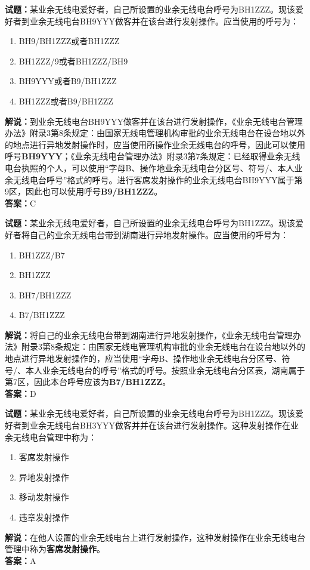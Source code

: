 \documentclass{ctexbook}
\begin{document}
\bigskip




\noindent\textbf{试题：}某业余无线电爱好者，自己所设置的业余无线电台呼号为BH1ZZZ。现该爱好者到业余无线电台BH9YYY做客并在该台进行发射操作。应当使用的呼号为：
\begin{enumerate}[leftmargin=3em]
\item BH9/BH1ZZZ或者BH1ZZZ
\item BH1ZZZ/9或者BH1ZZZ/BH9
\item BH9YYY或者B9/BH1ZZZ
\item BH1ZZZ或者B9/BH1ZZZ
\end{enumerate}
\noindent\textbf{解说：}到业余无线电台BH9YYY做客并在该台进行发射操作，《业余无线电台管理办法》附录3第8条规定：由国家无线电管理机构审批的业余无线电台在设台地以外的地点进行异地发射操作时，应当使用所操作业余无线电台的呼号，因此可以使用呼号\textbf{BH9YYY}；《业余无线电台管理办法》附录3第7条规定：已经取得业余无线电台执照的个人，可以使用“字母B、操作地业余无线电台分区号、符号/、本人业余无线电台呼号”格式的呼号。进行客席发射操作的业余无线电台BH9YYY属于第9区，因此也可以使用呼号\textbf{B9/BH1ZZZ}。\\\noindent\textbf{答案：}C

\bigskip




\noindent\textbf{试题：}某业余无线电爱好者，自己所设置的业余无线电台呼号为BH1ZZZ。现该爱好者将自己的业余无线电台带到湖南进行异地发射操作。应当使用的呼号为：
\begin{enumerate}[leftmargin=3em]
\item BH1ZZZ/B7
\item BH1ZZZ
\item BH7/BH1ZZZ
\item B7/BH1ZZZ
\end{enumerate}
\noindent\textbf{解说：}将自己的业余无线电台带到湖南进行异地发射操作，《业余无线电台管理办法》附录3第8条规定：由国家无线电管理机构审批的业余无线电台在设台地以外的地点进行异地发射操作的，应当使用“字母B、操作地业余无线电台分区号、符号/、本人业余无线电台的呼号”格式的呼号。按照业余无线电台分区表，湖南属于第7区，因此本台呼号应该为\textbf{B7/BH1ZZZ}。\\\noindent\textbf{答案：}D

\bigskip




\noindent\textbf{试题：}某业余无线电爱好者，自己所设置的业余无线电台呼号为BH1ZZZ。现该爱好者到业余无线电台BH3YYY做客并并在该台进行发射操作。这种发射操作在业余无线电台管理中称为：
\begin{enumerate}[leftmargin=3em]
\item 客席发射操作
\item 异地发射操作
\item 移动发射操作
\item 违章发射操作
\end{enumerate}
\noindent\textbf{解说：}在他人设置的业余无线电台上进行发射操作，这种发射操作在业余无线电台管理中称为\textbf{客席发射操作}。\\\noindent\textbf{答案：}A
\end{document}
